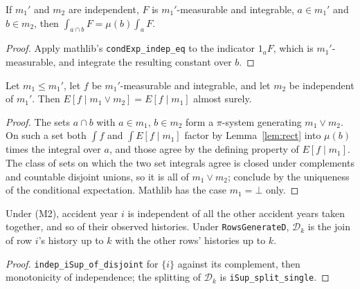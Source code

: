 \begin{lemma}[Rectangles]\label{lem:rect}\leanok
If $m_1'$ and $m_2$ are independent, $F$ is $m_1'$-measurable and integrable, $a \in m_1'$ and
$b \in m_2$, then $\int_{a \cap b} F = \mu(b) \int_a F$.
\end{lemma}
\begin{proof}\leanok Apply mathlib's \texttt{condExp\_indep\_eq} to the indicator $1_a F$, which is
$m_1'$-measurable, and integrate the resulting constant over $b$. \end{proof}

\begin{theorem}\label{thm:condExp_sup}\leanok
{}
Let $m_1 \le m_1'$, let $f$ be $m_1'$-measurable and integrable, and let $m_2$ be independent of
$m_1'$. Then $E[f \mid m_1 \vee m_2] = E[f \mid m_1]$ almost surely.
\end{theorem}
\begin{proof}\leanok The sets $a \cap b$ with $a \in m_1$, $b \in m_2$ form a $\pi$-system
generating $m_1 \vee m_2$. On such a set both $\int f$ and $\int E[f \mid m_1]$ factor by
Lemma~\ref{lem:rect} into $\mu(b)$ times the integral over $a$, and those agree by the defining
property of $E[f \mid m_1]$. The class of sets on which the two set integrals agree is closed
under complements and countable disjoint unions, so it is all of $m_1 \vee m_2$; conclude by the
uniqueness of the conditional expectation. Mathlib has the case $m_1 = \bot$ only. \end{proof}

\begin{lemma}\label{lem:indep_rows}\leanok
{}
Under (M2), accident year $i$ is independent of all the other accident years taken together, and
so of their observed histories. Under \texttt{RowsGenerateD}, $\mathcal{D}_k$ is the join of row $i$'s
history up to $k$ with the other rows' histories up to $k$.
\end{lemma}
\begin{proof}\leanok \texttt{indep\_iSup\_of\_disjoint} for $\{i\}$ against its complement, then
monotonicity of independence; the splitting of $\mathcal{D}_k$ is \texttt{iSup\_split\_single}. \end{proof}

